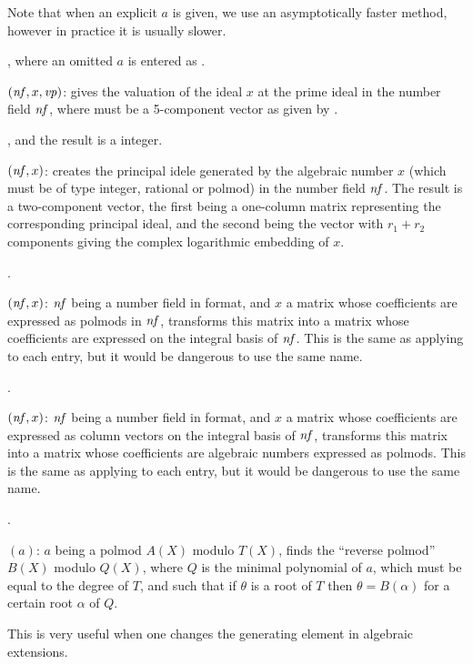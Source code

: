 Note that when an explicit $a$ is given, we use an asymptotically faster
method, however in practice it is usually slower.

, where an omitted $a$ is entered as
.

$(\hbox{\it nf\/},x,\hbox{\it vp\/})$: gives the valuation of the
ideal $x$ at the prime ideal  in the number field $\hbox{\it nf\/}$,
where  must be a
5-component vector as given by .

, and the result is a 
integer.

$(\hbox{\it nf\/},x)$: creates the principal idele
generated by the algebraic number $x$ (which must be of type integer,
rational or polmod) in the number field $\hbox{\it nf\/}$. The result is a
two-component vector, the first being a one-column matrix representing the
corresponding principal ideal, and the second being the vector with $r_1+r_2$
components giving the complex logarithmic embedding of $x$.

.

$(\hbox{\it nf\/},x)$: $\hbox{\it nf\/}$ being a number field in
 format, and $x$ a matrix whose coefficients are expressed as
polmods in $\hbox{\it nf\/}$, transforms this matrix into a matrix whose
coefficients are expressed on the integral basis of $\hbox{\it nf\/}$. This is the
same as applying  to each entry, but it would be dangerous
to use the same name.

.

$(\hbox{\it nf\/},x)$: $\hbox{\it nf\/}$ being a number field in
 format, and $x$ a matrix whose coefficients are expressed as
column vectors on the integral basis of $\hbox{\it nf\/}$, transforms this matrix
into a matrix whose coefficients are algebraic numbers expressed as
polmods. This is the same as applying  to each entry, but
it would be dangerous to use the same name.

.

$(a)$: $a$ being a polmod $A(X)$ modulo $T(X)$, finds
the ``reverse polmod'' $B(X)$ modulo $Q(X)$, where $Q$ is the minimal
polynomial of $a$, which must be equal to the degree of $T$, and such that if
$\theta$ is a root of $T$ then $\theta=B(\alpha)$ for a certain root $\alpha$
of $Q$.

This is very useful when one changes the generating element in algebraic
extensions.

